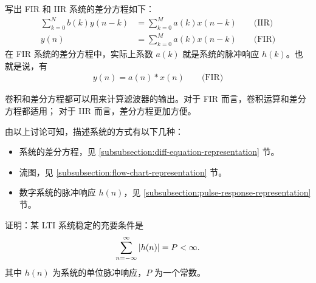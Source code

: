 \begin{property}[差分方程与卷积运算]
    \label{property:diff-equation-convolution}
    写出 FIR 和 IIR 系统的差分方程如下：
    \begin{align*}
        \sum_{k = 0}^{N}b(k)y(n - k) & = \sum_{k = 0}^{M}a(k)x(n - k) \qquad \text{(IIR)} \\
        y(n) & = \sum_{k = 0}^{M}a(k)x(n - k) \qquad \text{(FIR)}
    \end{align*}
    在 FIR 系统的差分方程中，实际上系数 $a(k)$ 就是系统的脉冲响应 $h(k)$。也就是说，有
    \begin{align*}
        y(n) = a(n) * x(n) \qquad \text{(FIR)}
    \end{align*}

    卷积和差分方程都可以用来计算滤波器的输出。对于 FIR 而言，卷积运算和差分方程都适用；
    对于 IIR 而言，差分方程更加方便。
\end{property}

\begin{remark}
    由以上讨论可知，描述系统的方式有以下几种：
    \begin{itemize}
        \item 系统的差分方程，见 \ref{subsubsection:diff-equation-representation} 节。
        \item 流图，见 \ref{subsubsection:flow-chart-representation} 节。
        \item 数字系统的脉冲响应 $h(n)$，见 \ref{subsubsection:pulse-response-representation} 节。
    \end{itemize}
\end{remark}

\begin{exercise}
    \label{exercise:LTI-stable}
    证明：某 LTI 系统稳定的充要条件是
    \begin{align*}
        \sum_{n = -\infty}^{\infty} \left|h(n)\right| = P < \infty.
    \end{align*}
    其中 $h(n)$ 为系统的单位脉冲响应，$P$ 为一个常数。
\end{exercise}

